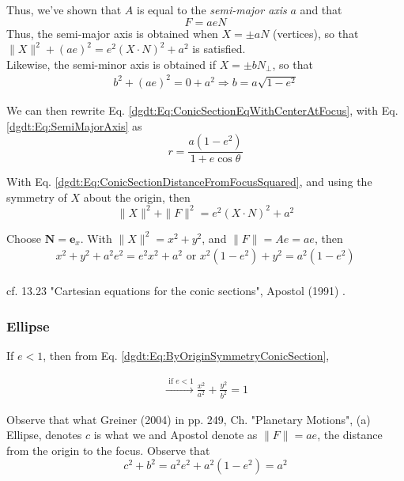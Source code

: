 \begin{theorem}
Thus, we've shown that $A$ is equal to the \emph{semi-major axis} $a$ and that 
\begin{equation}
\boxed{ F = aeN }
\end{equation}
Thus, the semi-major axis is obtained when $X = \pm aN$ (vertices), so that $\| X \|^2 + (ae)^2 = e^2 ( X\cdot N)^2 + a^2$ is satisfied. \\
Likewise, the semi-minor axis is obtained if $X = \pm bN_{\perp}$, so that
\begin{equation}\label{dgdt:Eq:ConicSectionSemiMinorAxis}
\begin{gathered}
	b^2 + (ae)^2 = 0 + a^2 \Longrightarrow \boxed{ b = a \sqrt{ 1 - e^2 } }
\end{gathered} 
\end{equation}

\end{theorem}

We can then rewrite Eq. \ref{dgdt:Eq:ConicSectionEqWithCenterAtFocus}, with Eq. \ref{dgdt:Eq:SemiMajorAxis} as
\[
\boxed{ r = \frac{ a(1-e^2) }{ 1 + e\cos{\theta} } }
\]

With Eq. \ref{dgdt:Eq:ConicSectionDistanceFromFocusSquared}, and using the symmetry of $X$ about the origin, then
\[
\| X \|^2 + \| F \|^2 = e^2 (X\cdot N)^2 + a^2
\]

Choose $\mathbf{N} = \mathbf{e}_x$. With $\|X\|^2 = x^2 + y^2$, and $\|F\| = Ae = ae$, then
\begin{equation}\label{dgdt:Eq:ByOriginSymmetryConicSection}
\begin{gathered}
x^2 + y^2 +a^2 e^2 = e^2 x^2 + a^2 \text{ or } x^2 ( 1 -e^2) + y^2 = a^2 ( 1-e^2) \\
\end{gathered}
\end{equation}

cf. 13.23 "Cartesian equations for the conic sections", Apostol (1991) \cite{dgdt:Apos1991}.

\subsubsection{Ellipse}

If $e <1$, then from Eq. \ref{dgdt:Eq:ByOriginSymmetryConicSection},

\[
\begin{gathered}
\xrightarrow{ \text{ if } e < 1 } \frac{x^2 }{ a^2 } + \frac{y^2}{b^2} = 1
\end{gathered}
\]

Observe that what  Greiner (2004) \cite{dgdt:Grei2004} in pp. 249, Ch. "Planetary Motions", (a) Ellipse, denotes $c$ is what we and Apostol denote as $\|F \| =ae$, the distance from the origin to the focus. Observe that
\[
c^2 + b^2 = a^2 e^2 + a^2 (1-e^2) = a^2
\]

